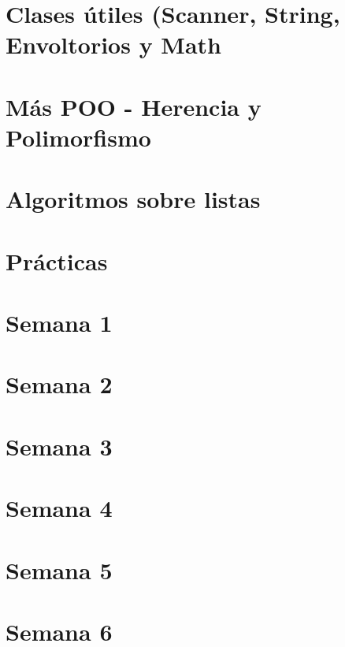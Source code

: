 \documentclass[12pt]{report} %
\begin{document}
\part{Clases útiles (Scanner, String, Envoltorios y Math}


\part{Más POO - Herencia y Polimorfismo}


\part{Algoritmos sobre listas}


\part{Prácticas}

\part{Semana 1}


\part{Semana 2}


\part{Semana 3}


\part{Semana 4}


\part{Semana 5}


\part{Semana 6}

\end{document}
